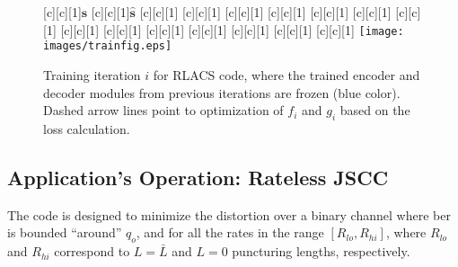 \begin{figure*}[ht]
\begin{center}
[c][c][1]{$\mathbf{s}$}
[c][c][1]{$\hat{\mathbf{s}}$}
[c][c][1]{}
[c][c][1]{}
[c][c][1]{}
[c][c][1]{\scalebox{.35}{concatenate}}
[c][c][1]{\scalebox{.35}{concatenate}}
[c][c][1]{}
[c][c][1]{}
[c][c][1]{}
[c][c][1]{}
[c][c][1]{}
[c][c][1]{}
[c][c][1]{}
    [c][c][1]{}
[c][c][1]{}
\texttt{[image: images/trainfig.eps]}
\caption{Training iteration $i$ for RLACS code, where the trained encoder and decoder modules from previous iterations are frozen (blue color). Dashed arrow lines point to optimization of $f_i$ and $g_i$ based on the loss calculation.}
\label{fig:trainfig}
\end{center}
\end{figure*}

\subsection{Application's Operation: Rateless JSCC}
\label{sec:ratelessjscc}


The  code is designed to minimize the distortion over a binary channel where \gls{ber} is bounded ``around'' $q_o$, and for all the rates in the range $[R_{lo}, R_{hi}]$, where $R_{lo}$ and $R_{hi}$ correspond to $L = \bar{L}$ and $L = 0$ puncturing lengths, respectively. 


